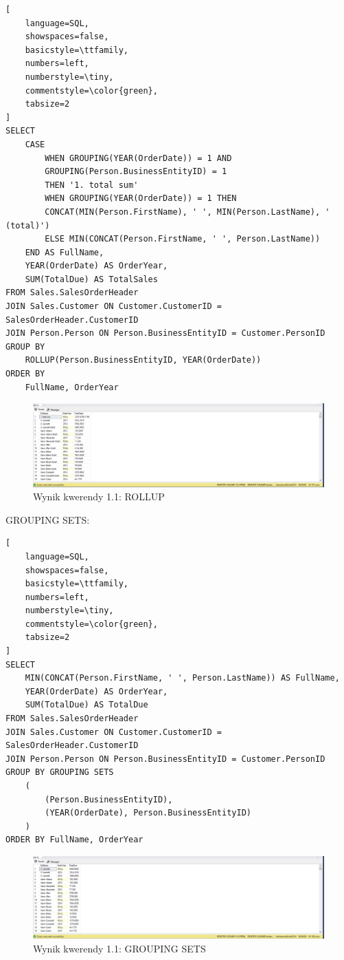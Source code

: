 \documentclass[a4paper,12pt]{article}
\begin{document}
{\small
\begin{lstlisting}[
	language=SQL,
	showspaces=false,
	basicstyle=\ttfamily,
	numbers=left,
	numberstyle=\tiny,
	commentstyle=\color{green},
	tabsize=2
]
SELECT
    CASE 
        WHEN GROUPING(YEAR(OrderDate)) = 1 AND 
        GROUPING(Person.BusinessEntityID) = 1 
        THEN '1. total sum'
        WHEN GROUPING(YEAR(OrderDate)) = 1 THEN 
        CONCAT(MIN(Person.FirstName), ' ', MIN(Person.LastName), ' (total)')
        ELSE MIN(CONCAT(Person.FirstName, ' ', Person.LastName))
    END AS FullName,
    YEAR(OrderDate) AS OrderYear,
    SUM(TotalDue) AS TotalSales
FROM Sales.SalesOrderHeader
JOIN Sales.Customer ON Customer.CustomerID = SalesOrderHeader.CustomerID
JOIN Person.Person ON Person.BusinessEntityID = Customer.PersonID
GROUP BY 
    ROLLUP(Person.BusinessEntityID, YEAR(OrderDate))
ORDER BY 
    FullName, OrderYear
\end{lstlisting}}

\begin{figure}[H]
  \centering
  \includegraphics[width=1.0\textwidth]{images/1.1_rollup.png}
  \caption{Wynik kwerendy 1.1: ROLLUP}
\end{figure}

GROUPING SETS:

{\small
\begin{lstlisting}[
	language=SQL,
	showspaces=false,
	basicstyle=\ttfamily,
	numbers=left,
	numberstyle=\tiny,
	commentstyle=\color{green},
	tabsize=2
]
SELECT
    MIN(CONCAT(Person.FirstName, ' ', Person.LastName)) AS FullName,	
    YEAR(OrderDate) AS OrderYear,
    SUM(TotalDue) AS TotalDue
FROM Sales.SalesOrderHeader
JOIN Sales.Customer ON Customer.CustomerID = SalesOrderHeader.CustomerID
JOIN Person.Person ON Person.BusinessEntityID = Customer.PersonID
GROUP BY GROUPING SETS
    (
		(Person.BusinessEntityID),
        (YEAR(OrderDate), Person.BusinessEntityID)
    )
ORDER BY FullName, OrderYear
\end{lstlisting}}

\begin{figure}[H]
  \centering
  \includegraphics[width=1.0\textwidth]{images/1.1_grouping.png}
  \caption{Wynik kwerendy 1.1: GROUPING SETS}
\end{figure}
\end{document}
